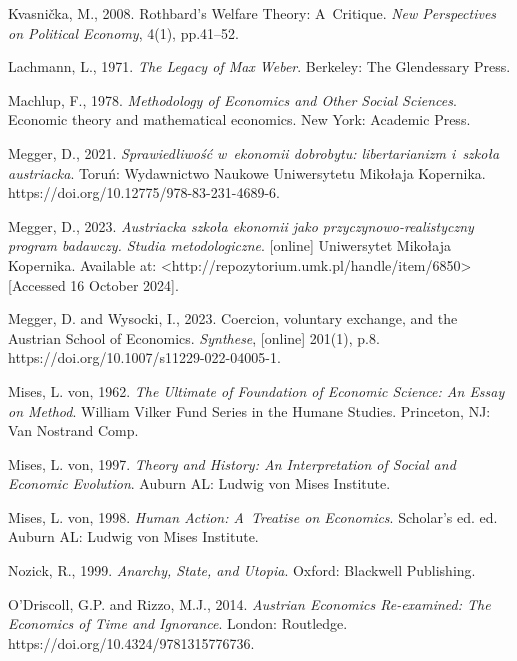 Kvasnička, M., 2008. Rothbard's Welfare Theory: A~Critique. \textit{New Perspectives on Political Economy}, 4(1), pp.41–52.



Lachmann, L., 1971. \textit{The Legacy of Max Weber}. Berkeley: The Glendessary Press.



Machlup, F., 1978. \textit{Methodology of Economics and Other Social Sciences}. Economic theory and mathematical economics. New York: Academic Press.



Megger, D., 2021. \textit{Sprawiedliwość w~ekonomii dobrobytu: libertarianizm i~szkoła austriacka}. Toruń: Wydawnictwo Naukowe Uniwersytetu Mikołaja Kopernika. https://doi.org/10.12775/978-83-231-4689-6.



Megger, D., 2023. \textit{Austriacka szkoła ekonomii jako przyczynowo-realistyczny program badawczy. Studia metodologiczne}. [online] Uniwersytet Mikołaja Kopernika. Available at: {\textless}http://repozytorium.umk.pl/handle/item/6850{\textgreater} [Accessed 16 October 2024].



Megger, D. and Wysocki, I., 2023. Coercion, voluntary exchange, and the Austrian School of Economics. \textit{Synthese}, [online] 201(1), p.8. https://doi.org/10.1007/s11229-022-04005-1.



Mises, L. von, 1962. \textit{The Ultimate of Foundation of Economic Science: An Essay on Method}. William Vilker Fund Series in the Humane Studies. Princeton, NJ: Van Nostrand Comp.



Mises, L. von, 1997. \textit{Theory and History: An Interpretation of Social and Economic Evolution}. Auburn AL: Ludwig von Mises Institute.



Mises, L. von, 1998. \textit{Human Action: A~Treatise on Economics}. Scholar's ed. ed. Auburn AL: Ludwig von Mises Institute.



Nozick, R., 1999. \textit{Anarchy, State, and Utopia}. Oxford: Blackwell Publishing.



O'Driscoll, G.P. and Rizzo, M.J., 2014. \textit{Austrian Economics Re-examined: The Economics of Time and Ignorance}. London: Routledge. https://doi.org/10.4324/9781315776736.




